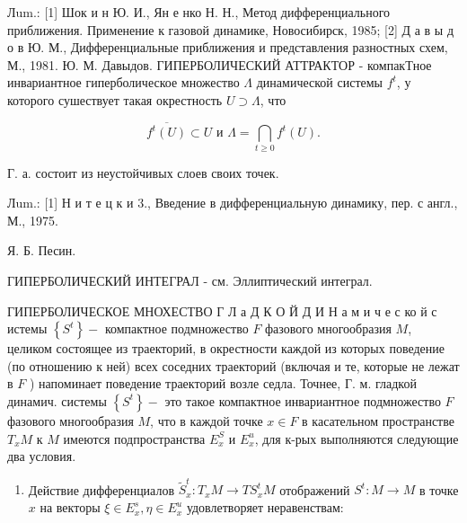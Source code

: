 \documentclass[10pt]{article}
\begin{document}
Лum.: [1] Шок и н Ю. И., Ян е нко Н. Н., Метод дифференциального приближения. Применение к газовой динамике, Новосибирск, 1985; [2] Д а в ы д о в Ю. М., Дифференциальные приближения и представления разностных схем, М., 1981. Ю. М. Давыдов. ГИПЕРБОЛИЧЕСКИЙ АТТРАКТОР - компакТное инвариантное гиперболическое множество $\Lambda$ динамической системы $f^{t}$, у которого сушествует такая окрестность $U \supset \Lambda$, что



\[

\overline{f^{t}(U)} \subset U \text { и } \Lambda=\bigcap_{t \geqslant 0} f^{t}(U) .

\]



Г. а. состоит из неустойчивых слоев своих точек.



Лum.: [1] Н и т е ц к и 3., Введение в дифференциальную динамику, пер. с англ., М., 1975.



Я. Б. Песин.



ГИПЕРБОЛИЧЕСКИЙ ИНТЕГРАЛ - см. Эллиптический интеграл.



ГИПЕРБОЛИЧЕСКОЕ МНОХЕСТВО Г Л а Д К О Й Д И Н а м и ч е с ко й с истемы $\left\{S^{t}\right\}-$ компактное подмножество $F$ фазового многообразия $M$, целиком состоящее из траекторий, в окрестности каждой из которых поведение (по отношению к ней) всех соседних траекторий (включая и те, которые не лежат в $F$ ) напоминает поведение траекторий возле седла. Точнее, Г. м. гладкой динамич. системы $\left\{S^{t}\right\}-$ это такое компактное инвариантное подмножество $F$ фазового многообразия $M$, что в каждой точке $x \in F$ в касательном пространстве $T_{x} M$ к $M$ имеются подпространства $E_{x}^{S}$ и $E_{x}^{u}$, для к-рых выполняются следующие два условия.



\begin{enumerate}

  \item Действие дифференциалов $\tilde{S}_{x}^{t}: T_{x} M \rightarrow T S_{x}^{t} M$ отображений $S^{t}: M \rightarrow M$ в точке $x$ на векторы $\xi \in E_{x}^{s}, \eta \in E_{x}^{u}$ удовлетворяет неравенствам:

\end{enumerate}
\end{document}
